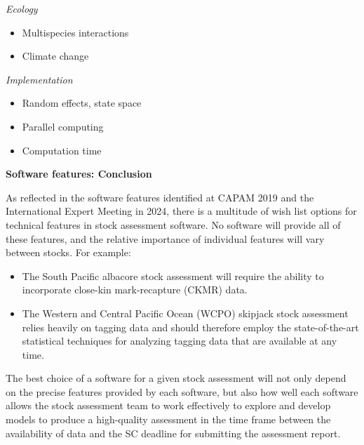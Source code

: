 \documentclass{SCreport}
\begin{document}
\vspace{1ex}

\textit{Ecology}

\begin{itemize}
  \item Multispecies interactions\\[-4.5ex]
  \item Climate change
\end{itemize}

\vspace{1ex}

\textit{Implementation}

\begin{itemize}
  \item Random effects, state space\\[-4.5ex]
  \item Parallel computing\\[-4.5ex]
  \item Computation time
\end{itemize}

\newpage

\textbf{Software features: Conclusion}

As reflected in the software features identified at CAPAM 2019 and the
International Expert Meeting in 2024, there is a multitude of wish list options
for technical features in stock assessment software. No software will provide
all of these features, and the relative importance of individual features will
vary between stocks. For example:

\begin{itemize}
  \item The South Pacific albacore stock assessment will require the ability to
  incorporate close-kin mark-recapture (CKMR) data.
  \item The Western and Central Pacific Ocean (WCPO) skipjack stock assessment
  relies heavily on tagging data and should therefore employ the
  state-of-the-art statistical techniques for analyzing tagging data that are
  available at any time.
\end{itemize}

The best choice of a software for a given stock assessment will not only depend
on the precise features provided by each software, but also how well each
software allows the stock assessment team to work effectively to explore and
develop models to produce a high-quality assessment in the time frame between
the availability of data and the SC deadline for submitting the assessment
report.
\end{document}
